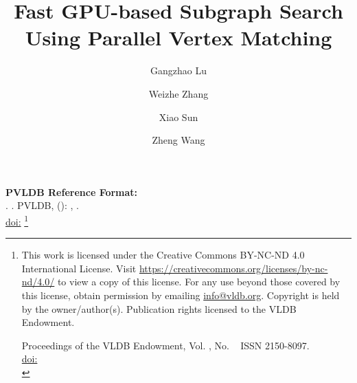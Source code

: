 \documentclass[sigconf, nonacm]{acmart}
\begin{document}
\title{Fast GPU-based Subgraph Search Using Parallel Vertex Matching}

\author{Gangzhao Lu}

\author{Weizhe Zhang}

\author{Xiao Sun}

\author{Zheng Wang}


\maketitle
\pagestyle{\vldbpagestyle}
\begingroup\small\noindent\raggedright\textbf{PVLDB Reference Format:}\\
\vldbauthors. \vldbtitle. PVLDB, \vldbvolume(\vldbissue): \vldbpages, \vldbyear.\\
\href{https://doi.org/\vldbdoi}{doi:\vldbdoi}
\endgroup
\begingroup
\renewcommand\thefootnote{}\footnote{\noindent
This work is licensed under the Creative Commons BY-NC-ND 4.0 International License. Visit \url{https://creativecommons.org/licenses/by-nc-nd/4.0/} to view a copy of this license. For any use beyond those covered by this license, obtain permission by emailing \href{mailto:info@vldb.org}{info@vldb.org}. Copyright is held by the owner/author(s). Publication rights licensed to the VLDB Endowment. \\
\raggedright Proceedings of the VLDB Endowment, Vol. \vldbvolume, No. \vldbissue\ %
ISSN 2150-8097. \\
\href{https://doi.org/\vldbdoi}{doi:\vldbdoi} \\
}\addtocounter{footnote}{-1}\endgroup














\end{document}
